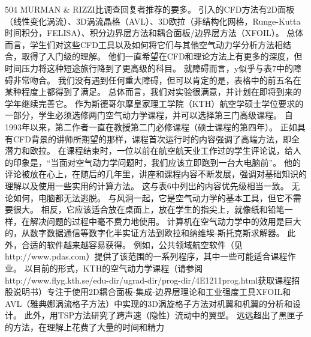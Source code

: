 \documentclass[UTF8,11pt,a4paper,openany,fontset=fandol]{ctexbook}
\begin{document}
504 MURMAN \& RIZZI比调查回复者推荐的要多。 引入的CFD方法有2D面板（线性变化涡流）、3D涡流晶格（AVL）、3D欧拉（非结构化网格，Runge-Kutta 时间积分，FELISA）、积分边界层方法和耦合面板/边界层方法（XFOIL）。 总体而言，学生们对这些CFD工具以及如何将它们与其他空气动力学分析方法相结合，取得了入门级的理解。 他们一直希望在CFD和理论方法上有更多的深度，但时间压力将这种短途旅行降到了更高级的科目。 就障碍而言，y似乎与表7中的障碍非常吻合。 我们没有遇到任何重大障碍，但可以肯定的是，表格中的前五名在某种程度上都得到了满足。 总体而言，我们对实验很满意，并计划在即将到来的学年继续完善它。 作为斯德哥尔摩皇家理工学院（KTH）航空学硕士学位要求的一部分，学生必须选修两门空气动力学课程，并可以选择第三门高级课程。 自1993年以来，第二作者一直在教授第二门必修课程（硕士课程的第四年）。 正如具有CFD背景的讲师所期望的那样，课程首次运行时的内容强调了高端方法，即全潜力和欧拉。 在课程结束时，一位以前在航空航天业工作过的学生评论说，给人的印象是，“当面对空气动力学问题时，我们应该立即跑到一台大电脑前”。 他的评论被放在心上，在随后的几年里，讲座和课程内容不断发展，强调对基础知识的理解以及使用一些实用的计算方法。 这与表6中列出的内容优先级相当一致。 无论如何，电脑都无法逃脱。 与风洞一起，它是空气动力学的基本工具，但它不需要很大。 相反，它应该适合放在桌面上，放在学生的指尖上，就像纸和铅笔一样，在解决问题的过程中毫不费力地使用。 计算机在空气动力学中的效用是巨大的，从数字数据通信等数字化半实证方法到欧拉和纳维埃-斯托克斯求解器。 此外，合适的软件越来越容易获得。 例如，公共领域航空软件（见http://www.pdas.com）提供了该范围的一系列程序，其中一些可能适合课程作业。 以目前的形式，KTH的空气动力学课程（请参阅http://www.flyg.kth.se/edu-dir/ugrad-dir/prog-dir/4E1211prog.html获取课程招股说明书）专注于使用2D耦合面板-集成-边界层理论和工业强度工具XFOIL和AVL（雅典娜涡流格子方法）中实现的3D涡旋格子方法对机翼和机翼的分析和设计。 此外，用TSP方法研究了跨声速（隐性）流动中的翼型。 远远超出了黑匣子的方法，在理解上花费了大量的时间和精力
\end{document}
